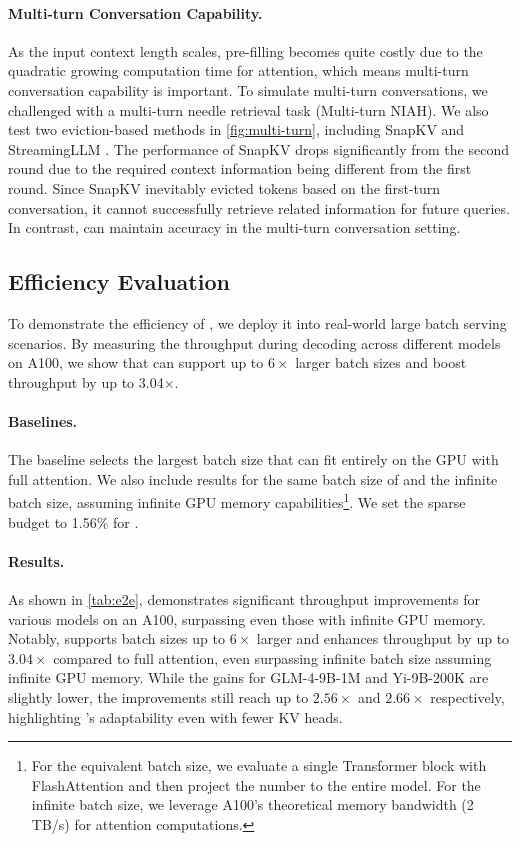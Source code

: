 \paragraph{Multi-turn Conversation Capability.} As the input context length scales, pre-filling becomes quite costly due to the quadratic growing computation time for attention, which means multi-turn conversation capability is important. To simulate multi-turn conversations, we challenged \Sys with a multi-turn needle retrieval task (Multi-turn NIAH). We also test two eviction-based methods in \cref{fig:multi-turn}, including SnapKV \citep{li2024snapkv} and StreamingLLM \citep{xiao2023efficient}. The performance of SnapKV drops significantly from the second round due to the required context information being different from the first round. Since SnapKV inevitably evicted tokens based on the first-turn conversation, it cannot successfully retrieve related information for future queries. In contrast, \Sys can maintain accuracy in the multi-turn conversation setting.

\subsection{Efficiency Evaluation}
\label{sec:eff}
To demonstrate the efficiency of \Sys, we deploy it into real-world large batch serving scenarios. By measuring the throughput during decoding across different models on A100, we show that \Sys can support up to $6\times$ larger batch sizes and boost throughput by up to 3.04$\times$.

\paragraph{Baselines.} The baseline selects the largest batch size that can fit entirely on the GPU with full attention. We also include results for the same batch size of \Sys and the infinite batch size, assuming infinite GPU memory capabilities\footnote{For the equivalent \Sys batch size, we evaluate a single Transformer block with FlashAttention and then project the number to the entire model. For the infinite batch size, we leverage A100's theoretical memory bandwidth (2 TB/s) for attention computations.}. We set the sparse budget to 1.56\% for \Sys.

\paragraph{Results.} As shown in \cref{tab:e2e}, \Sys demonstrates significant throughput improvements for various models on an A100, surpassing even those with infinite GPU memory. Notably, \Sys supports batch sizes up to $6\times$ larger and enhances throughput by up to $3.04\times$ compared to full attention, even surpassing infinite batch size assuming infinite GPU memory. While the gains for GLM-4-9B-1M and Yi-9B-200K are slightly lower, the improvements still reach up to $2.56\times$ and $2.66\times$ respectively, highlighting \Sys's adaptability even with fewer KV heads.

